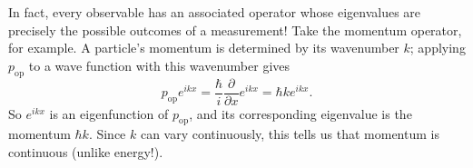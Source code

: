 \documentclass[../p052main.tex]{subfiles}
\begin{document}
In fact, every observable has an associated operator whose eigenvalues are precisely the possible outcomes of a measurement!
Take the momentum operator, for example.
A particle's momentum is determined by its wavenumber $k$; applying $p_\textrm{op}$ to a wave function with this wavenumber gives
\[ p_\textrm{op} e^{ikx} = \frac{\hbar}{i} \frac{\partial}{\partial x} e^{ikx} = \hbar k e^{ikx}. \]
So $e^{ikx}$ is an eigenfunction of $p_\textrm{op}$, and its corresponding eigenvalue is the momentum $\hbar k$.
Since $k$ can vary continuously, this tells us that momentum is continuous (unlike energy!).

\end{document}
